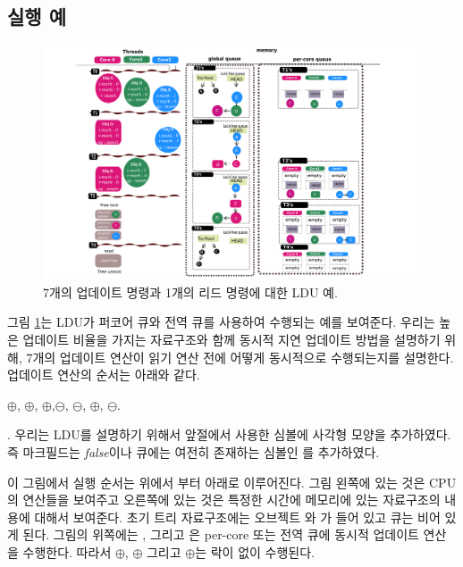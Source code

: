 \subsection{실행 예}
\begin{figure}[h!]
  \begin{center}
     \includegraphics[width=1.0\textwidth,height=0.4\textheight]{fig/basic_gldu}
  \end{center}
  \caption{7개의 업데이트 명령과 1개의 리드 명령에 대한 LDU 예.}
  \label{fig:basic}
\end{figure}


그림 \ref{fig:basic}는 LDU가 퍼코어 큐와 전역 큐를 사용하여 수행되는 예를 보여준다.
우리는 높은 업데이트 비율을 가지는 자료구조와 함께 동시적 지연 업데이트 방법을 설명하기 
위해, 7개의 업데이트 연산이 읽기 연산 전에 어떻게 동시적으로 수행되는지를 설명한다.
업데이트 연산의 순서는 아래와 같다. 
\begin{center}
$\oplus$, $\oplus$, $\oplus$,$\ominus$,
$\ominus$, $\oplus$, $\ominus$. 
\end{center}.
우리는 LDU를 설명하기 위해서 앞절에서 사용한 심볼에 사각형 모양을 추가하였다. 
즉 마크필드는 \textit{false}이나 큐에는 여전히 존재하는 심볼인 를 
추가하였다.

이 그림에서 실행 순서는 위에서 부터 아래로 이루어진다.
그림 왼쪽에 있는 것은 CPU의 연산들을 보여주고 오른쪽에 있는 것은 특정한 시간에 메모리에 있는
자료구조의 내용에 대해서 보여준다. 
초기 트리 자료구조에는 오브젝트 와 가 들어 있고 큐는 비어 있게 된다.
그림의 위쪽에는 ,  그리고 은 
per-core 또는 전역 큐에 동시적 업데이트 연산을 수행한다.
따라서 $\oplus$, $\oplus$ 그리고 $\oplus$는 락이 없이 수행된다.


